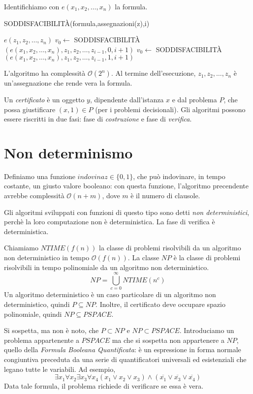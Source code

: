 \documentclass[11pt]{book}
\begin{document}
Identifichiamo con $e(x_1,x_2,\dots,x_n)$ la formula.
\begin{algorithm}
    \caption{SODDISFACIBILITÀ(formula,assegnazioni(z),i)}
    \begin{algorithmic}
        \Return $e(z_1,z_2,\dots,z_n)$
        \Else 
            \State $v_0\gets$ SODDISFACIBILITÀ $(e(x_1,x_2,\dots,x_n),z_1,z_2,\dots,z_{i-1},0,i+1)$
            \State $v_0\gets$ SODDISFACIBILITÀ $(e(x_1,x_2,\dots,x_n),z_1,z_2,\dots,z_{i-1},1,i+1)$
        \EndIf\\
    \end{algorithmic}
\end{algorithm} 
L'algoritmo ha complessità $\mathcal{O}(2^n)$. Al termine dell'esecuzione, $z_1,z_2,\dots,z_n$ è un'assegnazione che rende
vera la formula.

Un \textit{certificato} è un oggetto $y$, dipendente dall'istanza $x$ e dal problema $P$, che possa giustificare 
$(x,1)\in P$ (per i problemi decisionali).
Gli algoritmi possono essere riscritti in due fasi: fase di \textit{costruzione} e fase di \textit{verifica}.
\section{Non determinismo}
Definiamo una funzione $indovina z\in\{0,1\}$, che può indovinare, in tempo costante, un giusto valore booleano: con questa 
funzione, l'algoritmo precendente avrebbe complessità $\mathcal{O}(n+m)$, dove $m$ è il numero di clausole.

Gli algoritmi sviluppati con funzioni di questo tipo sono detti \textit{non deterministici}, perchè la loro computazione 
non è deterministica. La fase di verifica è deterministica.

Chiamiamo $NTIME(f(n))$ la classe di problemi risolvibili da un algoritmo non deterministico in tempo $\mathcal{O}(f(n))$.
La classe $NP$ è la classe di problemi risolvibili in tempo polinomiale da un algoritmo non deterministico.
\begin{equation*}
    NP=\bigcup^{\infty}_{c=0}NTIME(n^c)
\end{equation*}
Un algoritmo deterministico è un caso particolare di un algoritmo non deterministico, quindi $P\subseteq NP$. Inoltre, il 
certificato deve occupare spazio polinomiale, quindi $NP\subseteq PSPACE$.

Si sospetta, ma non è noto, che $P\subset NP$ e $NP\subset PSPACE$.
Introduciamo un problema appartenente a $PSPACE$ ma che si sospetta non appartenere a $NP$, quello della 
\textit{Formula Booleana Quantificata}: è un espressione in forma normale congiuntiva preceduta da una serie di quantificatori 
universali ed esistenziali che legano tutte le variabili. Ad esempio, 
\begin{equation*}
    \exists{x_1}\forall{x_2}\exists{x_3}\forall{x_4}(x_1 \vee x_2 \vee x_3) \wedge (\overline{x_1}\vee \overline{x_3}\vee \overline{x_4})
\end{equation*}
Data tale formula, il problema richiede di verificare se essa è vera.
\end{document}
